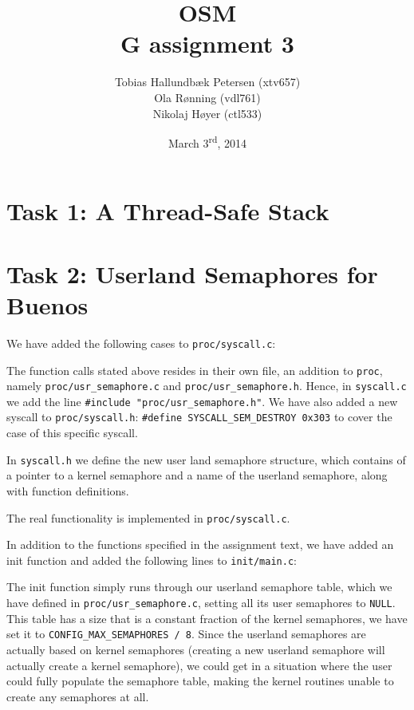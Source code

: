 \documentclass[a4paper,12pt]{article}
\title{OSM\\G assignment 3}
\author{Tobias Hallundbæk Petersen (xtv657)\\Ola Rønning (vdl761)\\Nikolaj Høyer (ctl533)}
\date{March 3\textsuperscript{rd}, 2014}
\begin{document}
\maketitle
\tableofcontents
\newpage

\section{Task 1: A Thread-Safe Stack}

\section{Task 2: Userland Semaphores for Buenos}
We have added the following cases to \texttt{proc/syscall.c}:



The function calls stated above resides in their own file, an addition to \texttt{proc}, namely \texttt{proc/usr\_semaphore.c} and \texttt{proc/usr\_semaphore.h}. Hence, in \texttt{syscall.c} we add the line \texttt{\#include "proc/usr\_semaphore.h"}. We have also added a new syscall to \texttt{proc/syscall.h}: \texttt{\#define SYSCALL\_SEM\_DESTROY 0x303} to cover the case of this specific syscall.

In \texttt{syscall.h} we define the new user land semaphore structure, which contains of a pointer to a kernel semaphore and a name of the userland semaphore, along with function definitions.



The real functionality is implemented in \texttt{proc/syscall.c}. 

In addition to the functions specified in the assignment text, we have added an init function and added the following lines to \texttt{init/main.c}:



The init function simply runs through our userland semaphore table, which we have defined in \texttt{proc/usr\_semaphore.c}, setting all its user semaphores to \texttt{NULL}. This table has a size that is a constant fraction of the kernel semaphores, we have set it to \texttt{CONFIG\_MAX\_SEMAPHORES / 8}. Since the userland semaphores are actually based on kernel semaphores (creating a new userland semaphore will actually create a kernel semaphore), we could get in a situation where the user could fully populate the semaphore table, making the kernel routines unable to create any semaphores at all.
\end{document}
